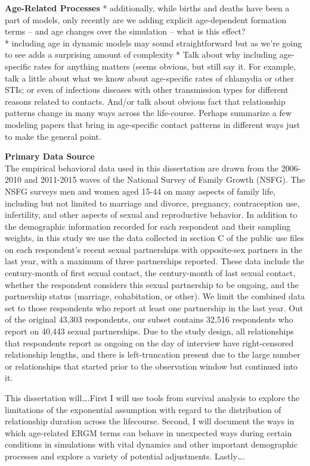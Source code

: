 \documentclass [11pt, proquest] {uwthesis}[2015/03/03]
\begin{document}
\textbf{Age-Related Processes} * additionally, while births and deaths
have been a part of models, only recently are we adding explicit
age-dependent formation terms -- and age changes over the simulation --
what is this effect?\\
* including age in dynamic models may sound straightforward but as we're
going to see adds a surprising amount of complexity * Talk about why
including age-specific rates for anything matters (seems obvious, but
still say it. For example, talk a little about what we know about
age-specific rates of chlamydia or other STIs; or even of infectious
diseases with other transmission types for different reasons related to
contacts. And/or talk about obvious fact that relationship patterns
change in many ways across the life-course. Perhaps summarize a few
modeling papers that bring in age-specific contact patterns in different
ways just to make the general point.

\textbf{Primary Data Source}\\
The empirical behavioral data used in this dissertation are drawn from
the 2006-2010 and 2011-2015 waves of the National Survey of Family
Growth (NSFG). The NSFG surveys men and women aged 15-44 on many aspects
of family life, including but not limited to marriage and divorce,
pregnancy, contraception use, infertility, and other aspects of sexual
and reproductive behavior. In addition to the demographic information
recorded for each respondent and their sampling weights, in this study
we use the data collected in section C of the public use files on each
respondent's recent sexual partnerships with opposite-sex partners in
the last year, with a maximum of three partnerships reported. These data
include the century-month of first sexual contact, the century-month of
last sexual contact, whether the respondent considers this sexual
partnership to be ongoing, and the partnership status (marriage,
cohabitation, or other). We limit the combined data set to those
respondents who report at least one partnership in the last year. Out of
the original 43,303 respondents, our subset contains 32,516 respondents
who report on 40,443 sexual partnerships. Due to the study design, all
relationships that respondents report as ongoing on the day of interview
have right-censored relationship lengths, and there is left-truncation
present due to the large number or relationships that started prior to
the observation window but continued into it.

This dissertation will\ldots{}.First I will use tools from survival
analysis to explore the limitations of the exponential assumption with
regard to the distribution of relationship duration across the
lifecourse. Second, I will document the ways in which age-related ERGM
terms can behave in unexpected ways during certain conditions in
simulations with vital dynamics and other important demographic
processes and explore a variety of potential adjustments.
Lastly\ldots{}.
\end{document}
